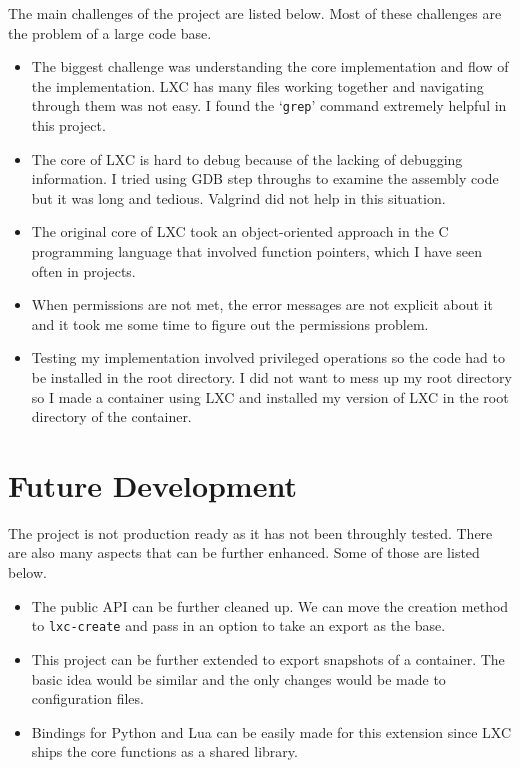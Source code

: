 \documentclass[12pt]{article}
\begin{document}
The main challenges of the project are listed below. Most of these challenges are the problem of a large code base.
\begin{itemize}
\item The biggest challenge was understanding the core implementation and flow of the implementation. LXC has many files working together and navigating through them was not easy. I found the `\texttt{grep}' command extremely helpful in this project.
\item The core of LXC is hard to debug because of the lacking of debugging information. I tried using GDB step throughs to examine the assembly code but it was long and tedious. Valgrind did not help in this situation.
\item The original core of LXC took an object-oriented approach in the C programming language that involved function pointers, which I have seen often in projects.
\item When permissions are not met, the error messages are not explicit about it and it took me some time to figure out the permissions problem.
\item Testing my implementation involved privileged operations so the code had to be installed in the root directory. I did not want to mess up my root directory so I made a container using LXC and installed my version of LXC in the root directory of the container.
\end{itemize}

\section{Future Development}

The project is not production ready as it has not been throughly tested. There are also many aspects that can be further enhanced. Some of those are listed below.
\begin{itemize}
\item The public API can be further cleaned up. We can move the creation method to \texttt{lxc-create} and pass in an option to take an export as the base.
\item This project can be further extended to export snapshots of a container. The basic idea would be similar and the only changes would be made to configuration files.
\item Bindings for Python and Lua can be easily made for this extension since LXC ships the core functions as a shared library.
\end{itemize}
\end{document}
